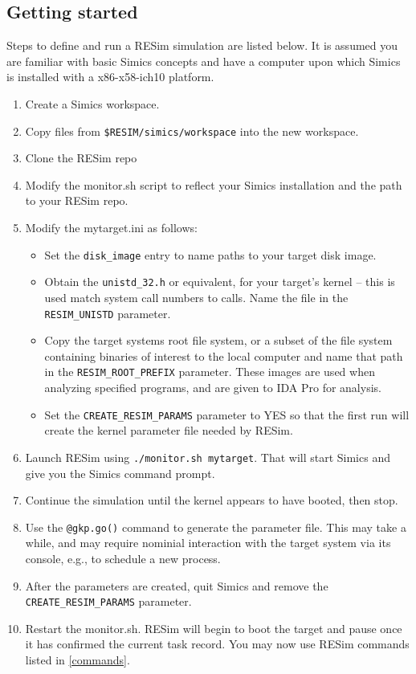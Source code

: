 \documentclass[titlepage]{article}
\begin{document}
\subsection{Getting started}
Steps to define and run a RESim simulation are listed below.  It is assumed you are familiar with basic Simics concepts and have a
computer upon which Simics is installed with a x86-x58-ich10 platform.
\begin{enumerate}
\item Create a Simics workspace.
\item Copy files from {\tt \$RESIM/simics/workspace} into the new workspace.
\item Clone the RESim repo 
\item Modify the monitor.sh script to reflect your Simics installation and the path to your RESim repo.
\item Modify the mytarget.ini as follows:
\begin{itemize}
\item Set the {\tt disk\_image} entry to name paths to your target disk image.
\item Obtain the {\tt unistd\_32.h} or equivalent, for your target's kernel -- this is used match system call numbers to calls.  Name
the file in the {\tt RESIM\_UNISTD} parameter.
\item Copy the target systems root file system, or a subset of the file system containing binaries of interest to the local computer
and name that path in the {\tt RESIM\_ROOT\_PREFIX} parameter.  These images are used when analyzing specified programs, and are given
to IDA Pro for analysis.
\item Set the {\tt CREATE\_RESIM\_PARAMS} parameter to YES so that the first run will create the kernel parameter file needed by RESim.
\end{itemize}
\item Launch RESim using {\tt ./monitor.sh mytarget}.  That will start Simics and give you the Simics command prompt.
\item  Continue the simulation until the kernel appears to have booted, then stop.
\item Use the {\tt @gkp.go()} command to generate the parameter file.  This may take a while, and may require nominial interaction
with the target system via its console, e.g., to schedule a new process.
\item After the parameters are created, quit Simics and remove the {\tt CREATE\_RESIM\_PARAMS} parameter.
\item Restart the monitor.sh.  RESim will begin to boot the target and pause once it has confirmed the current task record.  You
may now use RESim commands listed in \ref{commands}.
\end{enumerate}
\end{document}

